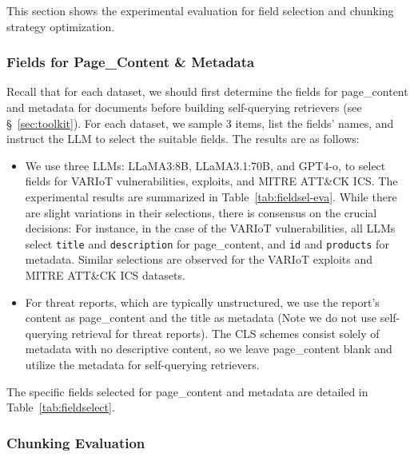 This section shows the experimental evaluation for field selection and chunking strategy optimization.



\subsubsection{Fields for Page\_Content \& Metadata}\label{sec:exp-field}
Recall that for each dataset, we should first determine the fields for page\_content and metadata for documents before building self-querying retrievers (see \S~\ref{sec:toolkit}).
For each dataset, we sample 3 items, list the fields' names, and instruct the LLM to select the suitable fields. The results are as follows:
\begin{itemize}
    \item We use three LLMs: LLaMA3:8B, LLaMA3.1:70B, and GPT4-o, to select fields for VARIoT vulnerabilities, exploits, and MITRE ATT\&CK ICS.
    The experimental results are summarized in Table~\ref{tab:fieldsel-eva}.
    While there are slight variations in their selections, there is consensus on the crucial decisions:
    For instance, in the case of the VARIoT vulnerabilities, all LLMs select \texttt{title} and \texttt{description} for page\_content, and \texttt{id} and \texttt{products} for metadata.
    Similar selections are observed for the VARIoT exploits and MITRE ATT\&CK ICS datasets.

    \item For threat reports, which are typically unstructured, we use the report's content as page\_content and the title as metadata (Note we do not use self-querying retrieval for threat reports). 
    The CLS schemes consist solely of metadata with no descriptive content, so we leave page\_content blank and utilize the metadata for self-querying retrievers.
\end{itemize}
The specific fields selected for page\_content and metadata are detailed in Table~\ref{tab:fieldselect}.





\subsubsection{Chunking Evaluation}\label{sec:exp-chunk}

%



